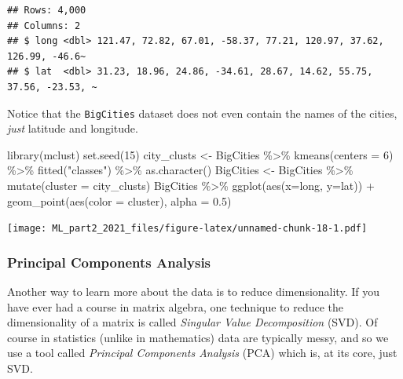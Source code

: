 \documentclass[
]{article}
\newenvironment{Shaded}{\begin{snugshade}}{\end{snugshade}}
\newcommand{\AttributeTok}[1]{\textcolor[rgb]{0.77,0.63,0.00}{#1}}
\newcommand{\DecValTok}[1]{\textcolor[rgb]{0.00,0.00,0.81}{#1}}
\newcommand{\FloatTok}[1]{\textcolor[rgb]{0.00,0.00,0.81}{#1}}
\newcommand{\FunctionTok}[1]{\textcolor[rgb]{0.00,0.00,0.00}{#1}}
\newcommand{\NormalTok}[1]{#1}
\newcommand{\OtherTok}[1]{\textcolor[rgb]{0.56,0.35,0.01}{#1}}
\newcommand{\SpecialCharTok}[1]{\textcolor[rgb]{0.00,0.00,0.00}{#1}}
\newcommand{\StringTok}[1]{\textcolor[rgb]{0.31,0.60,0.02}{#1}}
\begin{document}
\begin{verbatim}
## Rows: 4,000
## Columns: 2
## $ long <dbl> 121.47, 72.82, 67.01, -58.37, 77.21, 120.97, 37.62, 126.99, -46.6~
## $ lat  <dbl> 31.23, 18.96, 24.86, -34.61, 28.67, 14.62, 55.75, 37.56, -23.53, ~
\end{verbatim}

Notice that the \texttt{BigCities} dataset does not even contain the
names of the cities, \emph{just} latitude and longitude.

\begin{Shaded}
\begin{Highlighting}[]
\FunctionTok{library}\NormalTok{(mclust)}
\FunctionTok{set.seed}\NormalTok{(}\DecValTok{15}\NormalTok{)}
\NormalTok{city\_clusts }\OtherTok{\textless{}{-}}\NormalTok{ BigCities }\SpecialCharTok{\%\textgreater{}\%}
  \FunctionTok{kmeans}\NormalTok{(}\AttributeTok{centers =} \DecValTok{6}\NormalTok{) }\SpecialCharTok{\%\textgreater{}\%}
  \FunctionTok{fitted}\NormalTok{(}\StringTok{"classes"}\NormalTok{) }\SpecialCharTok{\%\textgreater{}\%}
  \FunctionTok{as.character}\NormalTok{()}
\NormalTok{BigCities }\OtherTok{\textless{}{-}}\NormalTok{ BigCities }\SpecialCharTok{\%\textgreater{}\%} \FunctionTok{mutate}\NormalTok{(}\AttributeTok{cluster =}\NormalTok{ city\_clusts)}
\NormalTok{BigCities }\SpecialCharTok{\%\textgreater{}\%} \FunctionTok{ggplot}\NormalTok{(}\FunctionTok{aes}\NormalTok{(}\AttributeTok{x=}\NormalTok{long, }\AttributeTok{y=}\NormalTok{lat)) }\SpecialCharTok{+}
  \FunctionTok{geom\_point}\NormalTok{(}\FunctionTok{aes}\NormalTok{(}\AttributeTok{color =}\NormalTok{ cluster), }\AttributeTok{alpha =} \FloatTok{0.5}\NormalTok{)}
\end{Highlighting}
\end{Shaded}

\texttt{[image: ML\_part2\_2021\_files/figure-latex/unnamed-chunk-18-1.pdf]}

\hypertarget{principal-components-analysis}{%
\subsubsection{Principal Components
Analysis}\label{principal-components-analysis}}

Another way to learn more about the data is to reduce dimensionality. If
you have ever had a course in matrix algebra, one technique to reduce
the dimensionality of a matrix is called \emph{Singular Value
Decomposition} (SVD). Of course in statistics (unlike in mathematics)
data are typically messy, and so we use a tool called \emph{Principal
Components Analysis} (PCA) which is, at its core, just SVD.
\end{document}
